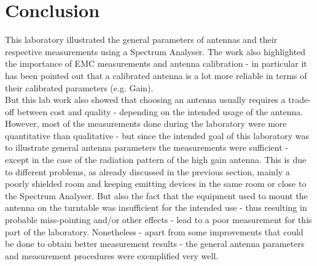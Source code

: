 \section{Conclusion}
This laboratory illustrated the general parameters of antennas and their respective measurements using a Spectrum Analyser. The work also highlighted the importance of EMC measurements and antenna calibration - in particular it has been pointed out that a calibrated antenna is a lot more reliable in terms of their calibrated parameters (e.g. Gain).\\
But this lab work also showed that choosing an antenna usually requires a trade-off between cost and quality - depending on the intended usage of the antenna.\\
However, most of the measurements done during the laboratory were more quantitative than qualitative - but since the intended goal of this laboratory was to illustrate general antenna parameters the measurements were sufficient - except in the case of the radiation pattern of the high gain antenna.
This is due to different problems, as already discussed in the previous section, mainly a poorly shielded room and keeping emitting devices in the same room or close to the Spectrum Analyser. But also the fact that the equipment used to mount the antenna on the turntable was insufficient for the intended use - thus resulting in probable miss-pointing and/or other effects - lead to a poor measurement for this part of the laboratory.
Nonetheless - apart from some improvements that could be done to obtain better measurement results - the general antenna parameters and measurement procedures were exemplified very well.











